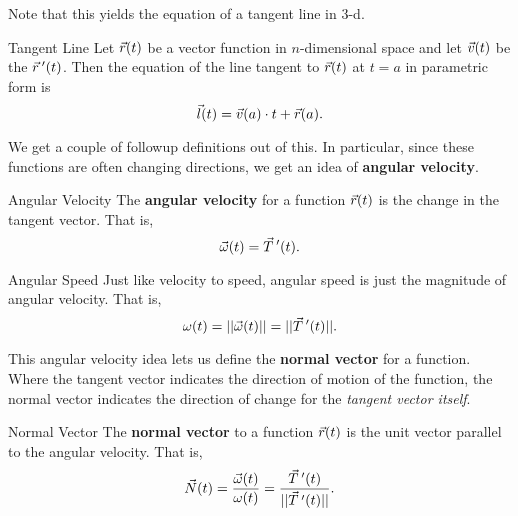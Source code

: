 Note that this yields the equation of a tangent line in 3-d.

\begin{definition}{Tangent Line}
Let $\vec{r}(t)$ be a vector function in $n$-dimensional space and let $\vec{v}(t)$ be the $\vec{r}\hspace{0.2em}'(t)$. Then the equation of the line tangent to $\vec{r}(t)$ at $t=a$ in parametric form is $$\vec{l}(t)=\vec{v}(a)\cdot t+\vec{r}(a). $$
\end{definition}

We get a couple of followup definitions out of this. In particular, since these functions are often changing directions, we get an idea of \textbf{angular velocity}.

\begin{definition}{Angular Velocity}
The \textbf{angular velocity} for a function $\vec{r}(t)$ is the change in the tangent vector. That is, $$\vec{\omega}(t)=\vec{T}\hspace{0.2em}'(t). $$
\end{definition}

\begin{definition}{Angular Speed}
Just like velocity to speed, angular speed is just the magnitude of angular velocity. That is, $$\omega(t)=||\vec{\omega}(t)||=||\vec{T}\hspace{0.2em}'(t)||. $$
\end{definition}

This angular velocity idea lets us define the \textbf{normal vector} for a function. Where the tangent vector indicates the direction of motion of the function, the normal vector indicates the direction of change for the \textit{tangent vector itself}.

\begin{definition}{Normal Vector}
The \textbf{normal vector} to a function $\vec{r}(t)$ is the unit vector parallel to the angular velocity. That is, $$\vec{N}(t)=\frac{\vec{\omega}(t)}{\omega(t)}=\frac{\vec{T}\hspace{0.2em}'(t)}{||\vec{T}\hspace{0.2em}'(t)||}. $$
\end{definition}

